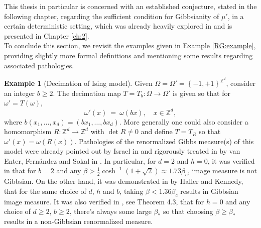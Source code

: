 \documentclass[12pt]{article}
\newcommand{\Z}{\mathbb{Z}}
\newcommand{\set}[1]{\left\{#1\right\}}
\newcommand{\ra}{\rightarrow}
\newcommand{\1}{\mathbbm{1}}
\newcommand{\5}{\vspace{0.5cm}}
\theoremstyle{definition}
\newtheorem{ex}[thm]{Example}
\begin{document}
This thesis in particular is concerned with an established conjecture, stated in the following chapter, regarding the sufficient condition for Gibbsianity of $\mu'$, in a certain deterministic setting, which was already heavily explored in \cite{Ber} and is presented in Chapter \ref{ch:2}. \\

To conclude this section, we revisit the examples given in Example \ref{RG:example}, providing slightly more formal definitions and mentioning some results regarding associated pathologies.

\begin{ex}[Decimation of Ising model]
Given $\Omega=\Omega'=\set{-1,+1}^{\Z^d}$, consider an integer $b\geq 2$. The decimation map $T=T_b:\Omega\ra\Omega'$ is given so that for $\omega'=T(\omega)$,
$$\omega'(x) ~=~ \omega(bx), \quad x\in\Z^d,$$
where $b(x_1,\ldots,x_d)=(bx_1,\ldots,bx_d)$. More generally one could also consider a homomorphism $R:\Z^d\ra\Z^d$ with $\det R\neq 0$ and define $T=T_R$ so that $\omega'(x)=\omega(R(x))$. Pathologies of the renormalized Gibbs measure(s) of  this model were already pointed out by Israel in \cite{Isr} and rigorously treated in by van Enter, Fern\'andez and Sokal in \cite{EFS}. In particular, for $d=2$ and $h=0$, it was verified in \cite{EFS} that for $b=2$ and any $\beta>\frac{1}{2}\cosh^{-1}(1+\sqrt{2})\approx 1.73\beta_c$, image measure is not Gibbsian. On the other hand, it was demonstrated in \cite{HK} by Haller and Kennedy, that for the same choice of $d$, $h$ and $b$, taking $\beta<1.36\beta_c$ results in Gibbsian image measure. It was also verified in \cite{EFS}, see Theorem 4.3, that for $h=0$ and any choice of $d\geq 2$, $b\geq 2$, there's always some large $\beta_*$ so that choosing $\beta\geq \beta_*$ results in a non-Gibbsian renormalized measure.
\end{ex}
\end{document}

